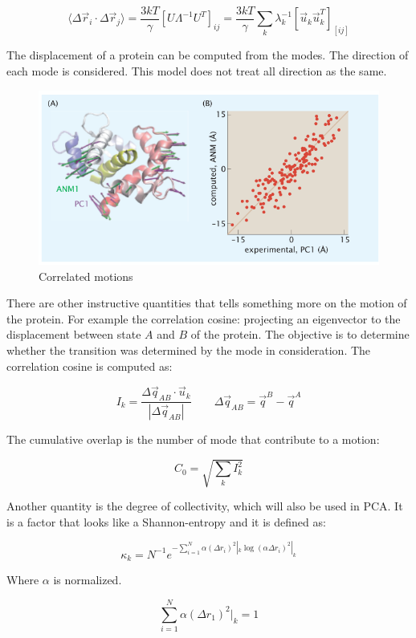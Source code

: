 		$$\langle\Delta\vec{r}_i\cdot\Delta\vec{r}_j\rangle = \frac{3kT}{\gamma}[U\Lambda^{-1}U^T]_{ij} = \frac{3kT}{\gamma}\sum\limits_{k}\lambda_k^{-1}[\vec{u}_k\vec{u}_k^T]_[ij]$$

		The displacement of a protein can be computed from the modes.
		The direction of each mode is considered.
		This model does not treat all direction as the same.

		\begin{figure}[H]
			\includegraphics[width=\textwidth]{asm-correlated-motion}
			\caption{Correlated motions}
			\label{fig:as-correlated-motion}
		\end{figure}

		There are other instructive quantities that tells something more on the motion of the protein.
		For example the correlation cosine: projecting an eigenvector to the displacement between state $A$ and $B$ of the protein.
		The objective is to determine whether the transition was determined by the mode in consideration.
		The correlation cosine is computed as:

		$$I_k = \frac{\Delta\vec{q}_{AB}\cdot\vec{u}_k}{|\Delta\vec{q}_{AB}|}\qquad \Delta\vec{q}_{AB} = \vec{q}^B-\vec{q}^A$$

		The cumulative overlap is the number of mode that contribute to a motion:

		$$C_0 = \sqrt{\sum\limits_k I_k^2}$$

		Another quantity is the degree of collectivity, which will also be used in PCA.
		It is a factor that looks like a Shannon-entropy and it is defined as:

		$$\kappa_k = N^{-1}e^{-\sum\limits_{i=1}^N\alpha(\Delta r_i)^2|_k\log(\alpha\Delta r_i)^2|_k}$$

		Where $\alpha$ is normalized.

		$$\sum\limits_{i=1}^N\alpha(\Delta r_1)^2|_k = 1$$

